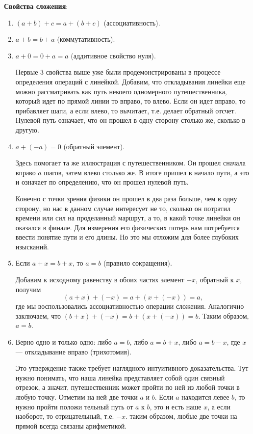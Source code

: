 \textbf{Свойства сложения}:
\begin{enumerate}[label=S\arabic*]
\item $(a+b)+c=a+(b+c)$ (ассоциативность).
\item $a+b=b+a$ (коммутативность).
\item $a+0=0+a=a$ (аддитивное свойство нуля).

Первые 3 свойства выше уже были продемонстрированы в процессе определения операций с линейкой. Добавим, что откладывания линейки еще можно рассматривать как путь некоего одномерного путешественника, который идет по прямой линии то вправо, то влево. Если он идет вправо, то прибавляет шаги, а если влево, то вычитает, т.е. делает обратный отсчет. Нулевой путь означает, что он прошел в одну сторону столько же, сколько в другую.

\item $a+(-a)=0$ (обратный элемент).

Здесь помогает та же иллюстрация с путешественником. Он прошел сначала вправо $a$ шагов, затем влево столько же. В итоге пришел в начало пути, а это и означает по определению, что он прошел нулевой путь.

Конечно с точки зрения физики он прошел в два раза больше, чем в одну сторону, но нас в данном случае интересует не то, сколько он потратил времени или сил на проделанный маршрут, а то, в какой точке линейки он оказался в финале. Для измерения его физических потерь нам потребуется ввести понятие пути и его длины. Но это мы отложим для более глубоких изысканий.

\item Если $a+x=b+x$, то $a=b$ (правило сокращения).

Добавим к исходному равенству в обоих частях элемент $-x$, обратный к $x$, получим
$$
(a+x)+(-x) = a+(x+(-x)) = a,
$$
где мы воспользовались ассоциативностью операции сложения. Аналогично заключаем, что $(b+x)+(-x) = b+(x+(-x)) = b$. Таким образом, $a=b$.

\item Верно одно и только одно: либо $a=b$, либо $a=b+x$, либо $a=b-x$, где $x$ --- откладывание вправо (трихотомия).

Это утверждение также требует наглядного интуитивного доказательства. Тут нужно понимать, что наша линейка представляет собой один связный отрезок, а значит, путешественник может пройти по ней из любой точки в любую точку. Отметим на ней две точки $a$ и $b$. Если $a$ находится левее $b$, то нужно пройти положи тельный путь от $a$ к $b$, это и есть наше $x$, а если наоборот, то отрицательный, т.е. $-x$. таким образом, любые две точки на прямой всегда связаны арифметикой.

\end{enumerate}
